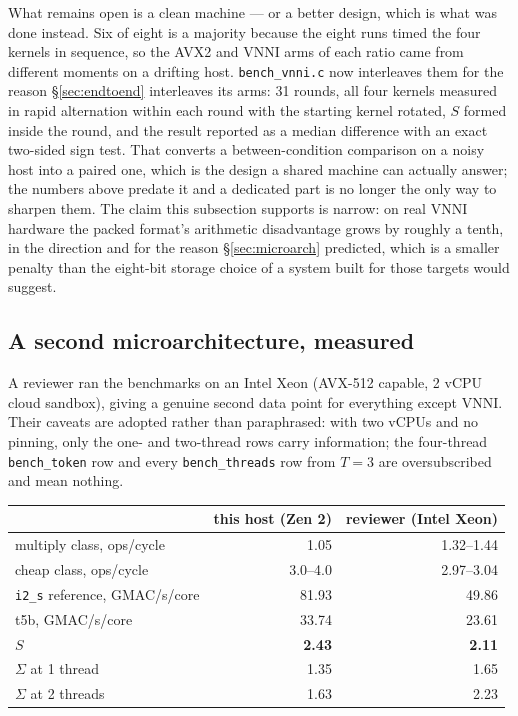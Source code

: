 \documentclass[11pt,a4paper]{article}
\newcommand{\code}[1]{\texttt{#1}}
\begin{document}
What remains open is a clean machine --- or a better design, which is
what was done instead. Six of eight is a majority because the eight runs timed
the four kernels in sequence, so the AVX2 and VNNI arms of each ratio came from
different moments on a drifting host. \code{bench\_vnni.c} now interleaves them
for the reason \S\ref{sec:endtoend} interleaves its arms:
31 rounds, all four kernels measured in rapid alternation within each round with
the starting kernel rotated, $S$ formed inside the round, and the result
reported as a median difference with an exact two-sided sign test. That converts
a between-condition comparison on a noisy host into a paired one,
which is the design a shared machine can actually answer; the numbers above
predate it and a dedicated part is no longer the only way to sharpen them. The claim this
subsection supports is narrow: on real VNNI hardware the packed format's
arithmetic disadvantage grows by roughly a tenth, in the direction and for the
reason \S\ref{sec:microarch} predicted, which is a smaller penalty than the
eight-bit storage choice of a system built for those targets would suggest.

\subsection{A second microarchitecture, measured}\label{sec:second}

A reviewer ran the benchmarks on an Intel Xeon (AVX-512 capable, 2 vCPU cloud
sandbox), giving a genuine second data point for everything except VNNI. Their
caveats are adopted rather than paraphrased: with two vCPUs and no pinning, only
the one- and two-thread rows carry information; the four-thread \code{bench\_token}
row and every \code{bench\_threads} row from $T=3$ are oversubscribed and mean
nothing.

\begin{center}
\begin{tabular}{lrr}
\toprule
 & this host (Zen 2) & reviewer (Intel Xeon) \\
\midrule
multiply class, ops/cycle       & \num{1.05}  & \numrange{1.32}{1.44} \\
cheap class, ops/cycle          & \numrange{3.0}{4.0} & \numrange{2.97}{3.04} \\
\code{i2\_s} reference, GMAC/s/core & \num{81.93} & \num{49.86} \\
t5b, GMAC/s/core                & \num{33.74} & \num{23.61} \\
\textbf{$S$}                    & \textbf{\num{2.43}} & \textbf{\num{2.11}} \\
$\Sigma$ at 1 thread            & \num{1.35}  & \num{1.65} \\
$\Sigma$ at 2 threads           & \num{1.63}  & \num{2.23} \\
\bottomrule
\end{tabular}
\end{center}
\end{document}
